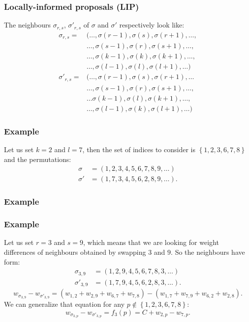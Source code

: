\begin{frame}
	\frametitle{Locally-informed proposals (LIP)}
	The neighbours $\sigma_{r,s}$, $\sigma'_{r,s}$ of $\sigma$ and $\sigma'$ respectively look like: 
	\begin{align*}
	\sigma_{r,s} = &(\ldots, \sigma(r-1), \sigma(s), \sigma(r+1), \ldots, \\
	&\ldots, \sigma(s-1), \sigma(r),\sigma(s+1), \ldots, \\
	&\ldots, \sigma(k-1), \sigma(k), \sigma(k+1), \ldots, \\
	& \ldots, \sigma(l-1), \sigma(l), \sigma(l+1), \ldots) \\
	\sigma'_{r,s} = &(\ldots, \sigma(r-1), \sigma(s), \sigma(r+1), \ldots \\
	& \ldots, \sigma(s-1), \sigma(r), \sigma(s+1), \ldots, \\
	&\ldots \sigma(k-1), \sigma(l), \sigma(k+1), \ldots, \\
	& \ldots, \sigma(l-1), \sigma(k), \sigma(l+1), \ldots)
	\end{align*}
\end{frame}

\begin{frame}
	\frametitle{Example}
	Let us set $k=2$ and $l=7$, then the set of indices to consider is $\left\{ 1,2,3,6,7,8 \right\}$ and the permutations:
	\begin{align*}
	\sigma &= (1, 2, 3, 4, 5, 6, 7, 8, 9, \ldots) \\
	\sigma' &= (1, 7, 3, 4, 5, 6, 2, 8, 9, \ldots).
	\end{align*}
\end{frame}

\begin{frame}
	\frametitle{Example}
	
\end{frame}

\begin{frame}
	\frametitle{Example}
	Let us set $r=3$ and $s=9$, which means that we are looking for weight differences of neighbours obtained by swapping $3$ and $9$. So the neighbours have form:
	\begin{align*}
		\sigma_{3,9} &= (1, 2, 9, 4, 5, 6, 7, 8, 3, \ldots) \\
		\sigma'_{3,9} &= (1, 7, 9, 4, 5, 6, 2, 8, 3, \ldots).
	\end{align*}
	\begin{equation*}
	w_{\sigma_{3,9}} - w_{\sigma'_{3,9}} = (w_{1,2} + w_{2,9} + w_{6,7} + w_{7,8}) - (w_{1,7} + w_{7,9} + w_{6,2} + w_{2,8}).
	\end{equation*}
	We can generalize that equation for any $p \notin \left\{ 1,2,3,6,7,8 \right\}$:
	\begin{equation*}
	w_{\sigma_{3,p}} - w_{\sigma'_{3,p}} = f_3(p) = C + w_{2,p} - w_{7,p}.
	\end{equation*}
\end{frame}

